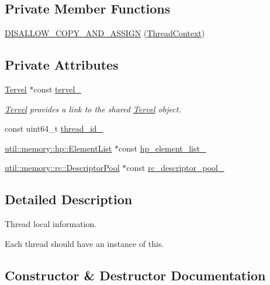 \subsection*{Private Member Functions}
\begin{DoxyCompactItemize}
\item 
\hyperlink{classtervel_1_1_thread_context_a83a120bf3799f3d3d05eeb21aab622d4}{D\+I\+S\+A\+L\+L\+O\+W\+\_\+\+C\+O\+P\+Y\+\_\+\+A\+N\+D\+\_\+\+A\+S\+S\+I\+G\+N} (\hyperlink{classtervel_1_1_thread_context}{Thread\+Context})
\end{DoxyCompactItemize}
\subsection*{Private Attributes}
\begin{DoxyCompactItemize}
\item 
\hyperlink{classtervel_1_1_tervel}{Tervel} $\ast$const \hyperlink{classtervel_1_1_thread_context_a1450770d0f80431f3b28a67c8b6b1f82}{tervel\+\_\+}
\begin{DoxyCompactList}\small\item\em \hyperlink{classtervel_1_1_tervel}{Tervel} provides a link to the shared \hyperlink{classtervel_1_1_tervel}{Tervel} object. \end{DoxyCompactList}\item 
const uint64\+\_\+t \hyperlink{classtervel_1_1_thread_context_aba7d0450873f2cb6afd9125d6d233983}{thread\+\_\+id\+\_\+}
\item 
\hyperlink{classtervel_1_1util_1_1memory_1_1hp_1_1_element_list}{util\+::memory\+::hp\+::\+Element\+List} $\ast$const \hyperlink{classtervel_1_1_thread_context_a3e8104c52171ea6887499cabab7228b8}{hp\+\_\+element\+\_\+list\+\_\+}
\item 
\hyperlink{classtervel_1_1util_1_1memory_1_1rc_1_1_descriptor_pool}{util\+::memory\+::rc\+::\+Descriptor\+Pool} $\ast$const \hyperlink{classtervel_1_1_thread_context_a7717d148600af10eebf3a4dc6c67dbed}{rc\+\_\+descriptor\+\_\+pool\+\_\+}
\end{DoxyCompactItemize}


\subsection{Detailed Description}
Thread local information. 

Each thread should have an instance of this. 

\subsection{Constructor \& Destructor Documentation}
\hypertarget{classtervel_1_1_thread_context_ad721aa4ac6705923d8559444ca44a1c8}{}

